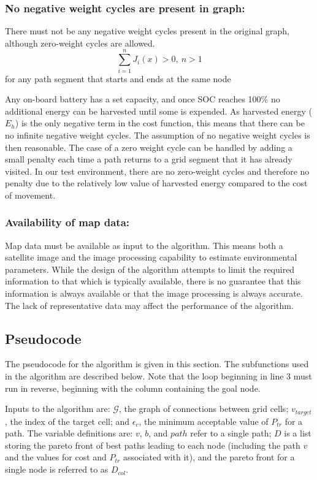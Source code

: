 \documentclass[journal]{IEEEtran}
\newcounter{col}
\begin{document}
\subsubsection{No negative weight cycles are present in graph:}
There must not be any negative weight cycles present in the original graph, although zero-weight cycles are allowed.
\begin{equation}
\sum_{i=1}^n J_i(x) > 0,\ n>1
\end{equation}
for any path segment that starts and ends at the same node

Any on-board battery has a set capacity, and once SOC reaches 100\% no additional energy can be harvested until some is expended. 
As harvested energy ($E_h$) is the only negative term in the cost function, this means that there can be no infinite negative weight cycles. 
The assumption of no negative weight cycles is then reasonable. 
The case of a zero weight cycle can be handled by adding a small penalty each time a path returns to a grid segment that it has already visited.
In our test environment, there are no zero-weight cycles and therefore no penalty due to the relatively low value of harvested energy compared to the cost of movement.

\subsubsection{Availability of map data:}
Map data must be available as input to the algorithm. 
This means both a satellite image and the image processing capability to estimate environmental parameters. 
While the design of the algorithm attempts to limit the required information to that which is typically available, there is no guarantee that this information is always available or that the image processing is always accurate. The lack of representative data may affect the performance of the algorithm.

\subsection{Pseudocode}
The pseudocode for the algorithm is given in this section. The subfunctions used in the algorithm are described below. 
Note that the loop beginning in line 3 must run in reverse, beginning with the column containing the goal node.

Inputs to the algorithm are: $\mathcal{G}$, the graph of connections between grid cells; $v_{target}$, the index of the target cell; and $\epsilon_c$, the minimum acceptable value of $P_{tr}$ for a path. The variable definitions are: $v$, $b$, and $path$ refer to a single path; $D$ is a list storing the pareto front of best paths leading to each node (including the path $v$ and the values for cost and $P_{tr}$ associated with it), and the pareto front for a single node is referred to as $D_{col}$.
\bigskip
\end{document}
